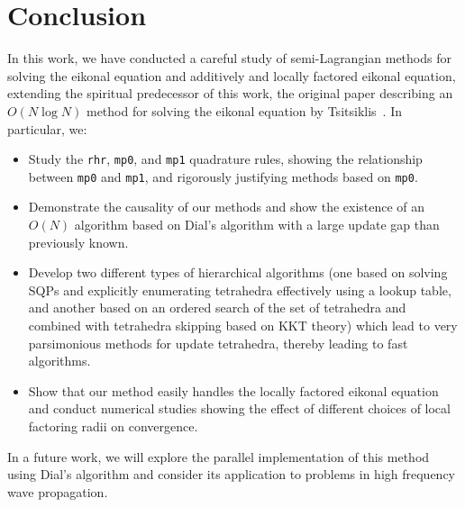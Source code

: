 \documentclass[eikonal.tex]{subfiles}
\begin{document}
\section{Conclusion} In this work, we have conducted a careful study
of semi-Lagrangian methods for solving the eikonal equation and
additively and locally factored eikonal equation, extending the
spiritual predecessor of this work, the original paper describing an
$O(N \log N)$ method for solving the eikonal equation by
Tsitsiklis~\cite{tsitsiklis1995efficient}. In particular, we:
\begin{itemize}
\item Study the \texttt{rhr}, \texttt{mp0}, and \texttt{mp1}
  quadrature rules, showing the relationship between \texttt{mp0} and
  \texttt{mp1}, and rigorously justifying methods based on
  \texttt{mp0}.
\item Demonstrate the causality of our methods and show the existence
  of an $O(N)$ algorithm based on Dial's algorithm with a large update
  gap than previously known.
\item Develop two different types of hierarchical algorithms (one
  based on solving SQPs and explicitly enumerating tetrahedra
  effectively using a lookup table, and another based on an ordered
  search of the set of tetrahedra and combined with tetrahedra
  skipping based on KKT theory) which lead to very parsimonious
  methods for update tetrahedra, thereby leading to fast algorithms.
\item Show that our method easily handles the locally factored eikonal
  equation and conduct numerical studies showing the effect of
  different choices of local factoring radii on convergence.
\end{itemize}
In a future work, we will explore the parallel implementation of this
method using Dial's algorithm and consider its application to problems
in high frequency wave propagation.
\end{document}
